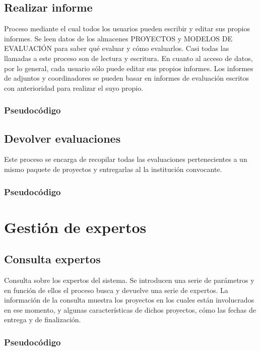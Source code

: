 \documentclass[12pt,a4paper,spanish,twoside]{book}
\begin{document}
\subsection{Realizar informe}
Proceso mediante el cual todos los usuarios pueden escribir y editar sus propios
informes. Se leen datos de los almacenes PROYECTOS y MODELOS DE EVALUACIÓN para 
saber qué evaluar y cómo evaluarlos. Casi todas las llamadas a este proceso son 
de lectura y escritura. En cuanto al acceso de datos, por lo general, cada 
usuario sólo puede editar sus propios informes. Los informes de adjuntos y 
coordinadores se pueden basar en informes de evaluación escritos con 
anterioridad para realizar el suyo propio.

\subsubsection{Pseudocódigo}

\subsection{Devolver evaluaciones}
Este proceso se encarga de recopilar todas las evaluaciones pertenecientes a un 
mismo paquete de proyectos y entregarlas al la institución convocante.

\subsubsection{Pseudocódigo}

\section{Gestión de expertos}

\subsection{Consulta expertos}
Consulta sobre los expertos del sistema. Se introducen una serie de parámetros y
en función de ellos el proceso busca y devuelve una serie de expertos. La 
información de la consulta muestra los proyectos en los cuales están 
involucrados en ese momento, y algunas características de dichos proyectos, cómo
las fechas de entrega y de finalización.

\subsubsection{Pseudocódigo}
\end{document}
